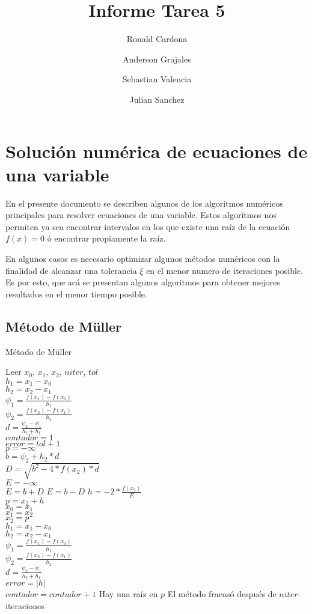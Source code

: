 \documentclass[12pt]{article}
\title{Informe Tarea 5}
\author {Ronald Cardona
\and Anderson Grajales
\and Sebastian Valencia
\and Julian Sanchez}
\begin{document}
\maketitle

\section{Solución numérica de ecuaciones de una variable}

En el presente documento se describen algunos de los algoritmos numéricos principales para resolver ecuaciones de una variable. Estos algoritmos nos permiten ya sea encontrar intervalos en los que existe una raíz de la ecuación $f(x) = 0$ ó encontrar propiamente la raíz.

En algunos casos es necesario optimizar algunos métodos numéricos con la finalidad de alcanzar una tolerancia $\xi$ en el menor numero de iteraciones posible. Es por esto, que acá se presentan algunos algoritmos para obtener mejores resultados en el menor tiempo posible.

\subsection{Método de Müller}

\begin{algorithm}[H]
	\caption{Método de Müller}
	\SetAlgoLined
	Leer $x_0$, $x_1$, $x_2$, $niter$, $tol$\\
	$h_1 = x_1 - x_0$\\
	$h_2 = x_2 - x_1$\\
	$\psi_1 = \frac{f(x_1) - f(x_0)}{h_1}$\\
	$\psi_2 = \frac{f(x_2) - f(x_1)}{h_2}$\\
	$d = \frac{\psi_2 - \psi_1}{h_2 + h_1}$\\
	$contador = 1$\\
	$error = tol + 1$\\
	$p = -\infty$\\
	{
		$b = \psi_2 + h_2*d$\\
		$D = \sqrt{b^2 - 4*f(x_2)*d}$\\
		$E = -\infty$\\
		{$E = b + D$}
		{$E = b - D$}
		$h = -2 * \frac{f(x_2)}{E}$\\
		$p = x_2 + h$\\
		$x_0 = x_1$\\
		$x_1 = x_2$\\
		$x_2 = p$\\
		$h_1 = x_1 - x_0$\\
		$h_2 = x_2 - x_1$\\
		$\psi_1 = \frac{f(x_1) - f(x_0)}{h_1}$\\
		$\psi_2 = \frac{f(x_2) - f(x_1)}{h_2}$\\
		$d = \frac{\psi_2 - \psi_1}{h_2 + h_1}$\\
		$error = |h|$\\
		$contador = contador + 1$
	}
	{Hay una raíz en $p$}
	{El método fracasó después de $niter$ iteraciones}
\end{algorithm}
\end{document}
